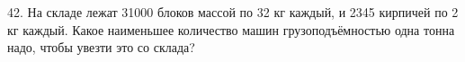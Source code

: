 42. На складе лежат 31000 блоков массой по 32 кг каждый, и 2345 кирпичей по 2 кг каждый. Какое наименьшее количество машин грузоподъёмностью одна тонна надо, чтобы увезти это со склада?\\
